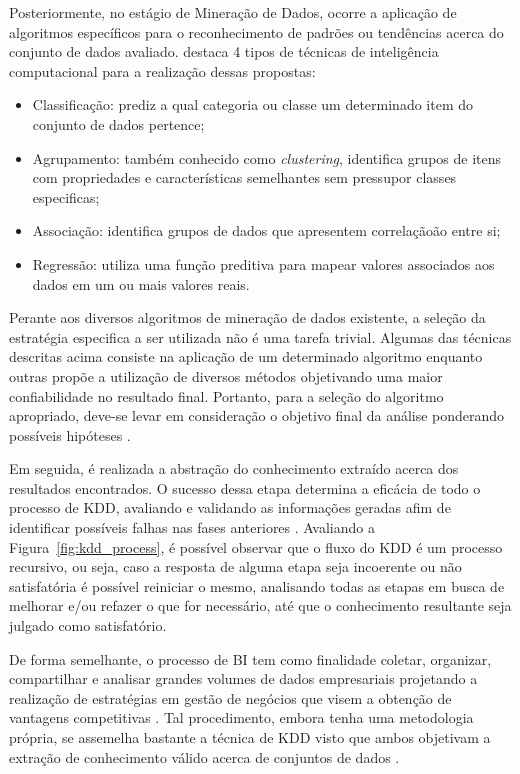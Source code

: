 Posteriormente, no estágio de Mineração de Dados, ocorre a aplicação de algoritmos específicos para o reconhecimento de padrões ou tendências acerca do conjunto de dados avaliado. \cite{cap02_ref5} destaca 4 tipos de técnicas de inteligência computacional para a realização dessas propostas: 

\begin{itemize}
    \item Classificação: prediz a qual categoria ou classe um determinado item do conjunto de dados pertence;
    \item Agrupamento: também conhecido como \textit{clustering}, identifica grupos de itens com propriedades e características semelhantes sem pressupor classes especificas;
    \item Associação: identifica grupos de dados que apresentem correlaçãoão entre si;
    \item Regressão: utiliza uma função preditiva para mapear valores associados aos dados em um ou mais valores reais.
\end{itemize}

Perante aos diversos algoritmos de mineração de dados existente, a seleção da estratégia especifica a ser utilizada não é uma tarefa trivial. Algumas das técnicas descritas acima consiste na aplicação de um determinado algoritmo enquanto outras propõe a utilização de diversos métodos objetivando uma maior confiabilidade no resultado final. Portanto, para a seleção do algoritmo apropriado, deve-se levar em consideração o objetivo final da análise ponderando possíveis hipóteses \cite{cap02_ref14}.

Em seguida, é realizada a abstração do conhecimento extraído acerca dos resultados encontrados. O sucesso dessa etapa determina a eficácia de todo o processo de KDD, avaliando e validando as informações geradas afim de identificar possíveis falhas nas fases anteriores \cite{cap02_ref12}. Avaliando a Figura~\ref{fig:kdd_process}, é possível observar que o fluxo do KDD é um processo recursivo, ou seja, caso a resposta de alguma etapa seja incoerente ou não satisfatória é possível reiniciar o mesmo, analisando todas as etapas em busca de melhorar e/ou refazer o que for necessário, até que o conhecimento resultante seja julgado como satisfatório.

De forma semelhante, o processo de BI tem como finalidade coletar, organizar, compartilhar e analisar grandes volumes de dados empresariais projetando a realização de estratégias em gestão de negócios que visem a obtenção de vantagens competitivas \cite{cap02_ref16, cap02_ref15}. Tal procedimento, embora tenha uma metodologia própria, se assemelha bastante a técnica de KDD visto que ambos objetivam a extração de conhecimento válido acerca de conjuntos de dados \cite{cap02_ref17}. 


